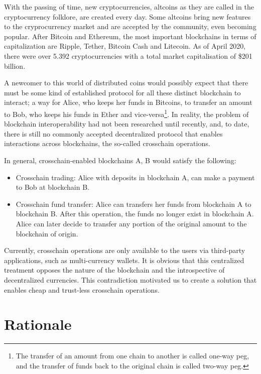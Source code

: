 With the passing of time, new cryptocurrencies, altcoins as they are called in
the cryptocurrency folklore, are created every day. Some altcoins bring new
features to the cryprocurrency market and are accepted by the community, even
becoming popular. After Bitcoin and Ethereum, the most important blockchains in
terms of capitalization are Ripple, Tether, Bitcoin Cash and Litecoin. As of
April 2020, there were over 5.392 cryptocurrencies with a total market
capitalisation of \$201 billion.

A newcomer to this world of distributed coins would possibly expect that there
must be some kind of established protocol for all these distinct blockchain to
interact; a way for Alice, who keeps her funds in Bitcoins, to transfer an
amount to Bob, who keeps his funds in Ether and vice-versa\footnote{The
    transfer of an amount from one chain to another is called one-way peg, and
the transfer of funds back to the original chain is called two-way peg.}.
In reality, the problem of blockchain interoperability had not been researched
until recently, and, to date, there is still no commonly accepted decentralized
protocol that enables interactions across blockchains, the so-called crosschain
operations.

\bigbreak
In general, crosschain-enabled blockchains A, B would satisfy the
following:

\begin{itemize}

    \item Crosschain trading: Alice with deposits in blockchain A, can make a
        payment to Bob at blockchain B.

    \item Crosschain fund transfer: Alice can transfers her funds from
        blockchain A to blockchain B. After this operation, the funds no longer
        exist in blockchain A. Alice can later decide to transfer any portion
        of the original amount to the blockchain of origin.

\end{itemize}

Currently, crosschain operations are only available to the users via
third-party applications, such as multi-currency wallets. It is obvious that
this centralized treatment opposes the nature of the blockchain and the
introspective of decentralized currencies. This contradiction motivated us to
create a solution that enables cheap and trust-less crosschain operations.

\section{Rationale}

